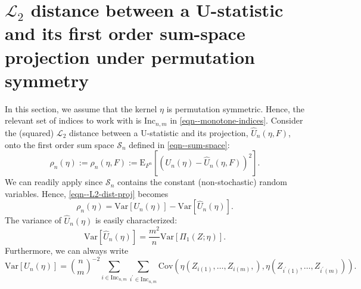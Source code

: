 \documentclass[12pt]{article}
\numberwithin{equation}{section}
\theoremstyle{definition}
\theoremstyle{plain}
\begin{document}
\section{\texorpdfstring{\(\mathscr{L}_{2}\)}{L2} distance between a U-statistic
and its first order sum-space projection under permutation symmetry}

In this section, we assume that the kernel \(\eta\) is permutation symmetric.
Hence, the relevant set of indices to work with is \(\mathrm{Inc}_{n, m}\)
in \eqref{eqn--monotone-indices}.
Consider the (squared) \(\mathscr{L}_{2}\) distance between a U-statistic and
its projection, \(\widehat{U}_{n} (\eta, F)\), onto the first order sum space
\(\mathcal{S}_{n}\) defined in
\eqref{eqn--sum-space}:
\begin{equation}
  \rho_{n} (\eta) := \rho_{n} (\eta, F) := \mathrm{E}_{F^{n}} \left[
  \left( U_{n} (\eta) - \widehat{U}_{n} (\eta, F) \right)^{2} \right].
  \label{eqn--L2-dist-proj}
\end{equation}
We can readily apply  since
\(\mathcal{S}_{n}\) contains the constant (non-stochastic) random
variables.
Hence, \eqref{eqn--L2-dist-proj} becomes
\begin{equation}
  \rho_{n} (\eta) = \mathrm{Var} \left[ U_{n} (\eta) \right] - \mathrm{Var}
  \left[ \widehat{U}_{n} (\eta) \right].
  \label{eqn--Ustat-proj-L2-dist-as-dif-of-vars}
\end{equation}
The variance of \(\widehat{U}_{n} (\eta)\) is easily characterized:
\begin{equation}
  \mathrm{Var} \left[ \widehat{U}_{n} (\eta) \right] = \frac{m^{2}}{n}
  \mathrm{Var} \left[ \Pi_{1} (Z; \eta) \right].
  \label{eqn--Uhat-var-1}
\end{equation}
Furthermore, we can always write
\begin{equation}
  \mathrm{Var} \left[ U_{n} (\eta) \right] = \binom{n}{m}^{- 2} \sum_{i \in
  \mathrm{Inc}_{n, m}} \sum_{i^{\prime} \in \mathrm{Inc}_{n, m}}
  \mathrm{Cov} \left( \eta \left( Z_{i (1)}, \dots, Z_{i (m)}, \right), \eta
  \left( Z_{i^{\prime} (1)}, \dots, Z_{i^{\prime} (m)} \right) \right).
  \label{eqn--Ustat-var-1}
\end{equation}
\end{document}
